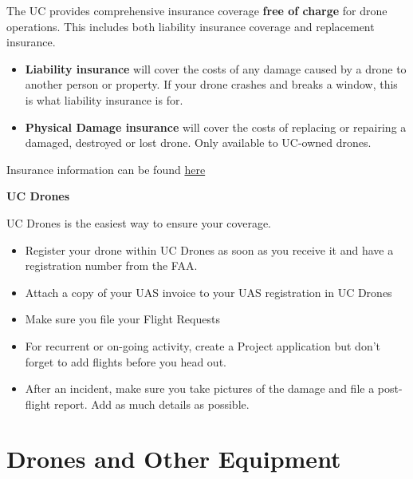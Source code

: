 \documentclass[
  12pt,
]{book}
\providecommand{\tightlist}{%
  \setlength{\itemsep}{0pt}\setlength{\parskip}{0pt}}
\begin{document}
The UC provides comprehensive insurance coverage \textbf{free of charge} for drone operations. This includes both liability insurance coverage and replacement insurance.

\begin{itemize}
\tightlist
\item
  \textbf{Liability insurance} will cover the costs of any damage caused by a drone to another person or property. If your drone crashes and breaks a window, this is what liability insurance is for.
\item
  \textbf{Physical Damage insurance} will cover the costs of replacing or repairing a damaged, destroyed or lost drone. Only available to UC-owned drones.
\end{itemize}

Insurance information can be found \href{https://ucdrones.github.io/ch-insurance.html}{here}

\textbf{UC Drones}

UC Drones is the easiest way to ensure your coverage.

\begin{itemize}
\tightlist
\item
  Register your drone within UC Drones as soon as you receive it and have a registration number from the FAA.
\item
  Attach a copy of your UAS invoice to your UAS registration in UC Drones
\item
  Make sure you file your Flight Requests
\item
  For recurrent or on-going activity, create a Project application but don't forget to add flights before you head out.
\item
  After an incident, make sure you take pictures of the damage and file a post-flight report. Add as much details as possible.
\end{itemize}

\chapter{Drones and Other Equipment}\label{drones-and-other-equipment}
\end{document}
